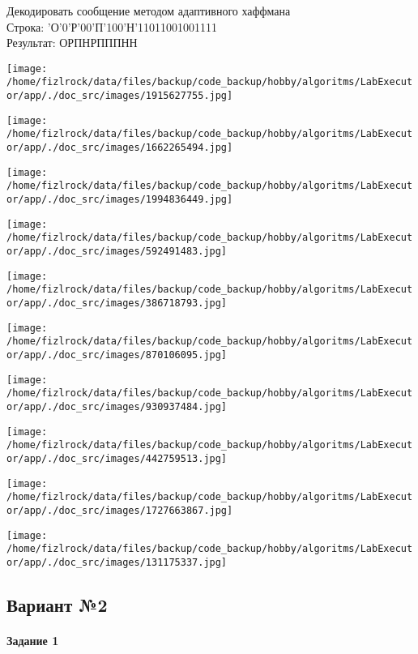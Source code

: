 \documentclass[a4paper, 12pt]{article}
\begin{document}
Декодировать сообщение методом адаптивного хаффмана \\
Строка: 
'О'0'Р'00'П'100'Н'11011001001111\\
Результат: ОРПНРПППНН

\texttt{[image: /home/fizlrock/data/files/backup/code\_backup/hobby/algoritms/LabExecutor/app/./doc\_src/images/1915627755.jpg]}

\texttt{[image: /home/fizlrock/data/files/backup/code\_backup/hobby/algoritms/LabExecutor/app/./doc\_src/images/1662265494.jpg]}

\texttt{[image: /home/fizlrock/data/files/backup/code\_backup/hobby/algoritms/LabExecutor/app/./doc\_src/images/1994836449.jpg]}

\texttt{[image: /home/fizlrock/data/files/backup/code\_backup/hobby/algoritms/LabExecutor/app/./doc\_src/images/592491483.jpg]}

\texttt{[image: /home/fizlrock/data/files/backup/code\_backup/hobby/algoritms/LabExecutor/app/./doc\_src/images/386718793.jpg]}

\texttt{[image: /home/fizlrock/data/files/backup/code\_backup/hobby/algoritms/LabExecutor/app/./doc\_src/images/870106095.jpg]}

\texttt{[image: /home/fizlrock/data/files/backup/code\_backup/hobby/algoritms/LabExecutor/app/./doc\_src/images/930937484.jpg]}

\texttt{[image: /home/fizlrock/data/files/backup/code\_backup/hobby/algoritms/LabExecutor/app/./doc\_src/images/442759513.jpg]}

\texttt{[image: /home/fizlrock/data/files/backup/code\_backup/hobby/algoritms/LabExecutor/app/./doc\_src/images/1727663867.jpg]}

\texttt{[image: /home/fizlrock/data/files/backup/code\_backup/hobby/algoritms/LabExecutor/app/./doc\_src/images/131175337.jpg]}
\pagebreak
\subsection{Вариант №2}
\paragraph{Задание 1}
\end{document}
